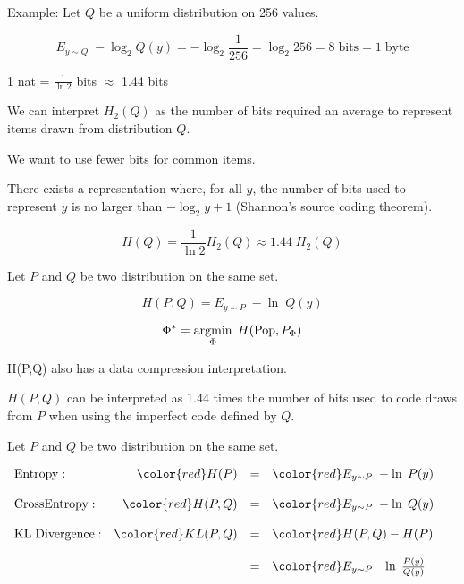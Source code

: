 {\vfill
Example: Let $Q$ be a uniform distribution on 256 values.

$$E_{y \sim Q}\;-\log_2 Q(y) = - \log_2 \frac{1}{256} = \log_2 256 = 8\;\mathrm{bits} = 1\;\mathrm{byte}$$

\vfill
\centerline{\color{red} 1 nat = $\frac{1}{\ln 2}$ bits $\approx$ 1.44 bits}


We can interpret {\color{red} $H_2(Q)$} as the number of bits required an average to represent items drawn from distribution $Q$.

\vfill
We want to use fewer bits for common items.

\vfill
There exists a representation where, for all $y$, the number of bits used to represent $y$ is no larger than $- \log_2 y + 1$ (Shannon's source coding theorem).

\vfill
{\color{red} $$H(Q) = \frac{1}{\ln 2} H_2(Q) \approx 1.44 \; H_2(Q)$$}




Let $P$ and $Q$ be two distribution on the same set.

{\color{red} $$H(P,Q) = E_{y \sim P} \;-\ln \;Q(y)$$}

{\color{red} $$\Phi^* = \operatorname*{argmin}_\Phi \;H(\mathrm{Pop},P_\Phi)$$}

\vfill
{\color{red} H(P,Q)} also has a data compression interpretation.

\vfill
{\color{red} $H(P,Q)$} can be interpreted as 1.44 times the number of bits used to code draws from $P$ when using the imperfect code defined by $Q$.


Let $P$ and $Q$ be two distribution on the same set.

\vfill
\centerline{
  $\begin{array}{lrcl}
\mathrm{Entropy}: & {\color{red} H(P)} & = & {\color{red} E_{y \sim P}\;-\ln\;P(y)} \\
\\
\mathrm{Cross Entropy:} & {\color{red} H(P,Q)} & = & {\color{red} E_{y \sim P}\;-\ln\;Q(y)} \\
\\
\mathrm{KL\; Divergence:} & {\color{red} KL(P,Q)} & = & {\color{red} H(P,Q) - H(P)} \\
\\
& & = & {\color{red} E_{y \sim P}\;\;\; \ln\;\frac{P(y)}{Q(y)}}
\end{array}$}

}
